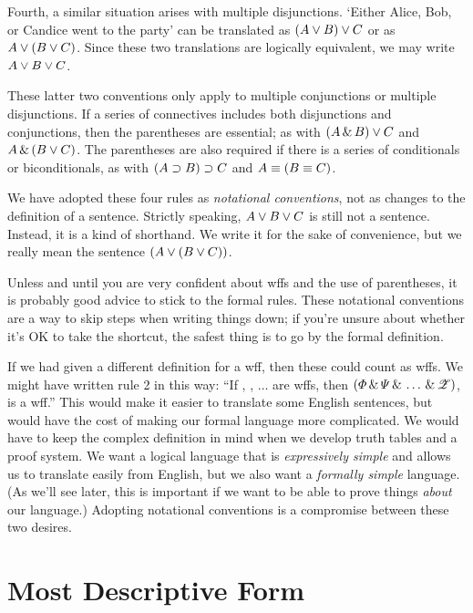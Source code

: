Fourth, a similar situation arises with multiple disjunctions. `Either Alice, Bob, or Candice went to the party' can be translated as $(A \vee B) \vee C$ or as $A \vee (B \vee C)$. Since these two translations are logically equivalent, we may write $A \vee B \vee C$.

These latter two conventions only apply to multiple conjunctions or multiple  disjunctions. If a series of connectives includes both disjunctions and conjunctions, then the parentheses are essential; as with $(A \,\&\, B) \vee C$ and $A \,\&\, (B \vee C)$. The parentheses are also required if there is a series of conditionals or biconditionals, as with $(A \supset B) \supset C$ and $A \equiv (B \equiv C)$.

We have adopted these four rules as \emph{notational conventions}, not as changes to the definition of a sentence. Strictly speaking, $A \vee B \vee C$ is still not a sentence. Instead, it is a kind of shorthand. We write it for the sake of convenience, but we really mean the sentence $(A \vee (B \vee C))$.

Unless and until you are very confident about wffs and the use of parentheses, it is probably good advice to stick to the formal rules. These notational conventions are a way to skip steps when writing things down; if you're unsure about whether it's OK to take the shortcut, the safest thing is to go by the formal definition.

If we had given a different definition for a wff, then these could count as wffs. We might have written rule 2 in this way: ``If \metaA{}, \metaB{}, $\ldots$  are wffs, then $(\varPhi{}\,\&\,\varPsi{}\,\&\,\ldots\,\&\,\mathscr{Z})$, is a wff.'' This would make it easier to translate some English sentences, but would have the cost of making our formal language more complicated. We would have to keep the complex definition in mind when we develop truth tables and a proof system. We want a logical language that is \emph{expressively simple} and allows us to translate easily from English, but we also want a \emph{formally simple} language. (As we'll see later, this is important if we want to be able to prove things \emph{about} our language.) Adopting notational conventions is a compromise between these two desires.


\section{Most Descriptive Form}
\label{sec:mostdescriptiveform}

